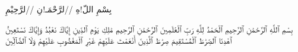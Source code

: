 \documentclass[12pt]{book}
\begin{document}
\chead{\qframe}
\fancyfoot{}
\setquran
{}
\begin{RLtext}
\Large
\centerline{ بِسْمِ اللّ!هِ //لرَّحْمَـ!نِ //لرَّحِيْمِ }
\noindent

بِسْمِ ٱللَّهِ ٱلرَّحْمَٰنِ ٱلرَّحِيمِ
ٱلْحَمْدُ لِلَّهِ رَبِّ ٱلْعَٰلَمِينَ
ٱلرَّحْمَٰنِ ٱلرَّحِيمِ
مَٰلِكِ يَوْمِ ٱلدِّينِ
إِيَّاكَ نَعْبُدُ وَإِيَّاكَ نَسْتَعِينُ
ٱهْدِنَا ٱلصِّرَٰطَ ٱلْمُسْتَقِيمَ
صِرَٰطَ ٱلَّذِينَ أَنْعَمْتَ عَلَيْهِمْ غَيْرِ ٱلْمَغْضُوبِ عَلَيْهِمْ وَلَا ٱلضَّآلِّينَ

\end{RLtext}
\end{document}
